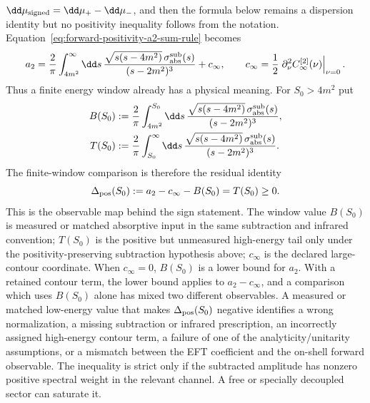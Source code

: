 \(\dd\mu_{\rm signed}=\dd\mu_+-\dd\mu_-\), and then the formula below remains a
dispersion identity but no positivity inequality follows from the notation.
Equation~\eqref{eq:forward-positivity-a2-sum-rule} becomes
\begin{equation}
  a_2
  =
  \frac{2}{\pi}
  \int_{4m^2}^{\infty}
  \dd s\,
  \frac{\sqrt{s(s-4m^2)}\,\sigma_{\rm abs}^{\rm sub}(s)}
       {(s-2m^2)^3}
  +
  c_\infty ,
  \qquad
  c_\infty=
  \frac12\left.
  \partial_\nu^2 C_\infty^{[2]}(\nu)\right|_{\nu=0}.
\label{eq:forward-positivity-cross-section-moment}
\end{equation}
Thus a finite energy window already has a physical meaning.  For
\(S_0>4m^2\) put
\begin{equation}
\begin{aligned}
  B(S_0)
  &:=
  \frac{2}{\pi}
  \int_{4m^2}^{S_0}
  \dd s\,
  \frac{\sqrt{s(s-4m^2)}\,\sigma_{\rm abs}^{\rm sub}(s)}
       {(s-2m^2)^3},
\\
  T(S_0)
  &:=
  \frac{2}{\pi}
  \int_{S_0}^{\infty}
  \dd s\,
  \frac{\sqrt{s(s-4m^2)}\,\sigma_{\rm abs}^{\rm sub}(s)}
       {(s-2m^2)^3}.
\end{aligned}
\label{eq:forward-positivity-window-moment}
\end{equation}
The finite-window comparison is therefore the residual identity
\begin{equation}
  \Delta_{\rm pos}(S_0)
  :=
  a_2-c_\infty-B(S_0)
  =
  T(S_0)
  \ge0 .
\label{eq:forward-positivity-window-residual}
\end{equation}
This is the observable map behind the sign statement.  The window value
\(B(S_0)\) is measured or matched absorptive input in the same subtraction and
infrared convention; \(T(S_0)\) is the positive but unmeasured high-energy tail
only under the positivity-preserving subtraction hypothesis above; \(c_\infty\)
is the declared large-contour coordinate.  When
\(c_\infty=0\), \(B(S_0)\) is a lower bound for \(a_2\).  With a retained
contour term, the lower bound applies to \(a_2-c_\infty\), and a comparison
which uses \(B(S_0)\) alone has mixed two different observables.  A measured or
matched low-energy value that makes
\(\Delta_{\rm pos}(S_0)\) negative identifies a wrong normalization, a missing
subtraction or infrared prescription, an incorrectly assigned high-energy
contour term, a failure of one of the analyticity/unitarity assumptions, or a
mismatch between the EFT coefficient and the on-shell forward observable.  The
inequality is strict only if the subtracted amplitude has nonzero positive
spectral weight in the relevant channel.  A free or specially decoupled sector
can saturate it.

